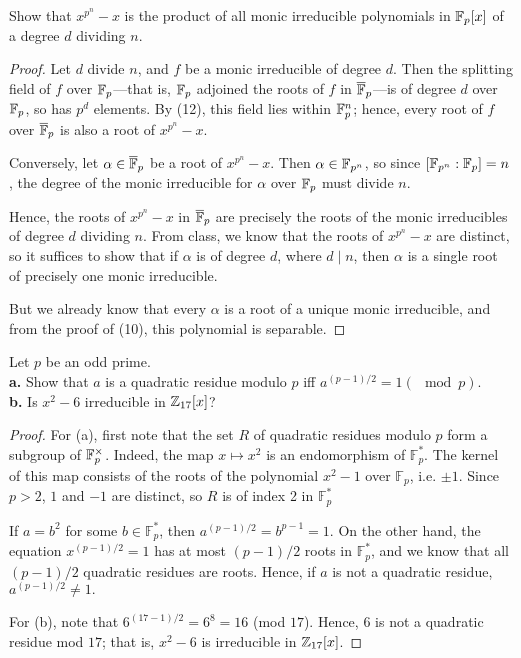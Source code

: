 \documentclass{article}
\begin{document}
 Show that $x^{p^n} - x$ is the product of all monic irreducible polynomials in $\mathbb{F}_p[x]$ of a degree $d$ dividing $n$.
\begin{proof}
Let $d$ divide $n$, and $f$ be a monic irreducible of degree $d$. Then the splitting field of $f$ over $\mathbb{F}_p$---that is, $\mathbb{F}_p$ adjoined the roots of $f$ in $\overline{\mathbb{F}}_p$---is of degree $d$ over $\mathbb{F}_p$, so has $p^d$ elements. By (12), this field lies within $\mathbb{F}_p^n$; hence, every root of $f$ over $\overline{\mathbb{F}}_p$ is also a root of $x^{p^n} -x$.

Conversely, let $\alpha \in \overline{\mathbb{F}}_p$ be a root of $x^{p^n} - x$. Then $\alpha \in \mathbb{F}_{p^n}$, so since $[\mathbb{F}_{p^n} : \mathbb{F}_p] = n$, the degree of the monic irreducible for $\alpha$ over $\mathbb{F}_p$ must divide $n$.

Hence, the roots of $x^{p^n} -x$ in $\overline{\mathbb{F}}_p$ are precisely the roots of the monic irreducibles of degree $d$ dividing $n$. From class, we know that the roots of $x^{p^n} -x$ are distinct, so it suffices to show that if $\alpha$ is of degree $d$, where $d \mid n$, then $\alpha$ is a single root of precisely one monic irreducible.

But we already know that every $\alpha$ is a root of a unique monic irreducible, and from the proof of (10), this polynomial is separable.
\end{proof}

 Let $p$ be an odd prime. \\
\textbf{a.} Show that $a$ is a quadratic residue modulo $p$ iff $a^{(p-1)/2} = 1 (\mod p)$. \\
\textbf{b.} Is $x^2 - 6$ irreducible in $\mathbb{Z}_{17}[x]$?
\begin{proof}
For (a), first note that the set $R$ of quadratic residues  modulo $p$ form a subgroup of $\mathbb{F}_p^\times$. Indeed, the map $x \mapsto x^2$ is an endomorphism of $\mathbb{F}_p^*$. The kernel of this map consists of the roots of the polynomial $x^2-1$ over $\mathbb{F}_p$, i.e. $\pm 1$. Since $p>2$, $1$ and $-1$ are distinct, so $R$ is of index 2 in $\mathbb{F}_p^*$

If $a = b^2$ for some $b \in \mathbb{F}_p^*$, then $a^{(p-1)/2} = b^{p-1} = 1.$  On the other hand, the equation $x^{(p-1)/2} = 1$ has at most $(p-1)/2$ roots in $\mathbb{F}_p^*$, and we know that all $(p-1)/2$ quadratic residues are roots.  Hence, if $a$ is not a quadratic residue, $a^{(p-1)/2} \neq 1.$ 

For (b), note that $6^{(17-1)/2} = 6^8 = 16$ (mod $17$). Hence, $6$ is not a quadratic residue mod $17$; that is, $x^2 -6$ is irreducible in $\mathbb{Z}_{17}[x]$.
\end{proof}
\end{document}
